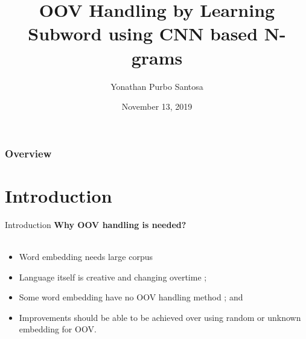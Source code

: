 \documentclass{beamer}
\title[Short title]{OOV Handling by Learning Subword using CNN based N-grams} %
\author{Yonathan Purbo Santosa} %
\institute[Institut f{\"u}r Informatik] %
{
Institut f{\"u}r Informatik\\
Rheinische Friedrich-Wilhelms-Universit{\"a}t Bonn %
\medskip
}
\date{November 13, 2019} %
\begin{document}
\begin{frame}
\titlepage %
\end{frame}

\begin{frame}
\frametitle{Overview} %
\tableofcontents %
\end{frame}


\section{Introduction}
\begin{frame}{Introduction}
    \textbf{Why OOV handling is needed?}\\~\\

    \begin{itemize}
        \item Word embedding needs large corpus
        \item Language itself is creative and changing overtime
        \cite{forrester2008abrief, speech2009Jurafsky};
        \item Some word embedding have no OOV handling method
        \cite{polyglot2013alrfo, dict2vect2017tissier, efficient2013mikolov}; and 
        \item Improvements should be able to be achieved over using
        random or unknown embedding for OOV.
    \end{itemize}
\end{frame}
\end{document}
